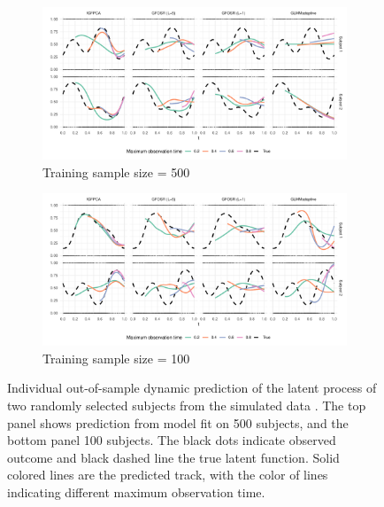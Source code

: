 \documentclass[12pt]{article}
\begin{document}
\begin{figure}
    \centering

    \begin{subfigure}{\textwidth}
    \includegraphics[width=\textwidth]{Figs/simN500.pdf}
    \caption{Training sample size = 500}
    \label{fig:sim1}
    \end{subfigure}

    \begin{subfigure}{\textwidth}
    \includegraphics[width=\textwidth]{Figs/simN100.pdf}
    \caption{Training sample size = 100}
    \label{fig:sim2}
    \end{subfigure}
    
    \caption{Individual out-of-sample dynamic prediction of the latent process of two randomly selected subjects from the simulated data . The top panel shows prediction from model fit on 500 subjects, and the bottom panel 100 subjects. The black dots indicate observed outcome and black dashed line the true latent function. Solid colored lines are the predicted track, with the color of lines indicating different maximum observation time. }
\end{figure}
\end{document}
